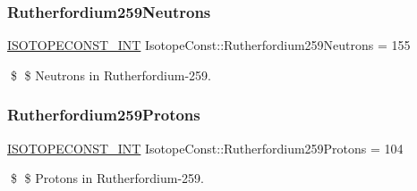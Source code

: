 \subsubsection{\texorpdfstring{Rutherfordium259\+Neutrons}{Rutherfordium259Neutrons}}
{\footnotesize\ttfamily \mbox{\hyperlink{group___isotope_const-_macros_ga5f18360b3e99483a35c32d789e62621c}{I\+S\+O\+T\+O\+P\+E\+C\+O\+N\+S\+T\+\_\+\+I\+NT}} Isotope\+Const\+::\+Rutherfordium259\+Neutrons = 155}

\$ \$ Neutrons in Rutherfordium-\/259. \mbox{\label{group___isotope_const-_rutherfordium-_rf259_gada39eb79bfd59a5eccddf2b371a70aef}} 
\subsubsection{\texorpdfstring{Rutherfordium259\+Protons}{Rutherfordium259Protons}}
{\footnotesize\ttfamily \mbox{\hyperlink{group___isotope_const-_macros_ga5f18360b3e99483a35c32d789e62621c}{I\+S\+O\+T\+O\+P\+E\+C\+O\+N\+S\+T\+\_\+\+I\+NT}} Isotope\+Const\+::\+Rutherfordium259\+Protons = 104}

\$ \$ Protons in Rutherfordium-\/259. 
